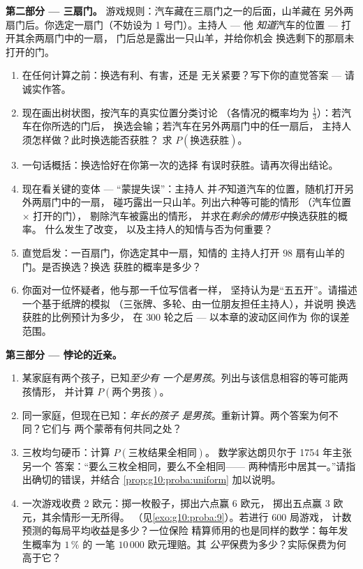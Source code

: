 \begin{problem}
\medskip
\noindent\textbf{第二部分 --- 三扇门。}
游戏规则：汽车藏在三扇门之一的后面，山羊藏在
另外两扇门后。你选定一扇门（不妨设为 1 号门）。主持人 --- 他
\emph{知道}汽车的位置 --- 打开其余两扇门中的一扇，
门后总是露出一只山羊，并给你机会
换选剩下的那扇未打开的门。
\begin{enumerate}[resume]
  \item 在任何计算之前：换选有利、有害，还是
        无关紧要？写下你的直觉答案 --- 请诚实作答。
  \item 现在画出树状图，按汽车的真实位置分类讨论
        （各情况的概率均为 $\frac13$）：若汽车在你所选的门后，
        换选会输；若汽车在另外两扇门中的任一扇后，
        主持人须怎样做？此时换选能否获胜？
        求 $P(\text{换选获胜})$。
  \item 一句话概括：换选恰好在你第一次的选择
        有误时获胜。请再次得出结论。
  \item 现在看关键的变体 --- “蒙提失误”：主持人
        并\emph{不}知道汽车的位置，随机打开另外两扇门中的一扇，
        碰巧露出一只山羊。列出六种等可能的情形
        （汽车位置 $\times$ 打开的门），
        剔除汽车被露出的情形，
        并求在\emph{剩余的情形中}换选获胜的概率。
        什么发生了改变，
        以及主持人的知情与否为何重要？
  \item 直觉启发：一百扇门，你选定其中一扇，知情的
        主持人打开 $98$ 扇有山羊的门。是否换选？换选
        获胜的概率是多少？
  \item 你面对一位怀疑者，他与那一千位写信者一样，
        坚持认为是“五五开”。请描述一个基于纸牌的模拟
        （三张牌、多轮、由一位朋友担任主持人），并说明
        换选获胜的比例预计为多少，
        在 $300$ 轮之后 --- 以本章的波动区间作为
        你的误差范围。
\end{enumerate}

\medskip
\noindent\textbf{第三部分 --- 悖论的近亲。}
\begin{enumerate}[resume]
  \item 某家庭有两个孩子，已知\emph{至少有
        一个是男孩}。列出与该信息相容的等可能两孩情形，
        并计算
        $P(\text{两个男孩})$。
  \item 同一家庭，但现在已知：\emph{年长的孩子
        是男孩}。重新计算。两个答案为何不同？它们与
        两个蒙蒂有何共同之处？
  \item 三枚均匀硬币：计算 $P(\text{三枚结果全相同})$。
        数学家达朗贝尔于 1754 年主张另一个
        答案：“要么三枚全相同，要么不全相同——
        两种情形中居其一。”请指出确切的错误，并结合
        \cref{prop:g10:proba:uniform} 加以说明。
  \item 一次游戏收费 $2$ 欧元：掷一枚骰子，掷出六点赢 $6$ 欧元，
        掷出五点赢 $3$ 欧元，其余情形一无所得。
        （见\cref{exo:g10:proba:9}）。若进行 $600$ 局游戏，
        计数预测的每局平均收益是多少？一位保险
        精算师用的也是同样的数学：每年发生概率为 $1\,\%$ 的
        一笔 $10\,000$ 欧元理赔。其
        \emph{公平}保费为多少？实际保费为何
        高于它？
\end{enumerate}


\end{problem}
